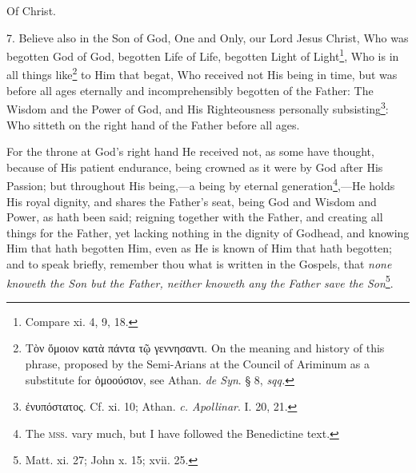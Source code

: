 Of Christ.

7. Believe also in the Son of God, One and Only, our Lord Jesus Christ, Who was begotten God of God, begotten Life of Life, begotten Light of Light\footnote{Compare xi. 4, 9, 18.}, Who is in all things like\footnote{\textgreek{Τὸν ὅμοιον κατὰ πάντα τῷ γεννησαντι}. On the meaning and history of this phrase, proposed by the Semi-Arians at the Council of Ariminum as a substitute for \textgreek{ὁμοούσιον}, see Athan. \emph{de Syn}. § 8, \emph{sqq.}} to Him that begat, Who received not His being in time, but was before all ages eternally and incomprehensibly begotten of the Father: The Wisdom and the Power of God, and His Righteousness personally subsisting\footnote{\textgreek{ἐνυπόστατος}. Cf. xi. 10; Athan. \emph{c. Apollinar}. I. 20, 21.}: Who sitteth on the right hand of the Father before all ages.

For the throne at God’s right hand He received not, as some have thought, because of His patient endurance, being crowned as it were by God after His Passion; but throughout His being,—a being by eternal generation\footnote{The \textsc{mss.} vary much, but I have followed the Benedictine text.},—He holds His royal dignity, and shares the Father’s seat, being God and Wisdom and Power, as hath been said; reigning together with the Father, and creating all things for the Father, yet lacking nothing in the dignity of Godhead, and knowing Him that hath begotten Him, even as He is known of Him that hath begotten; and to speak briefly, remember thou what is written in the Gospels, that \emph{none knoweth the Son but the Father, neither knoweth any the Father save the Son}\footnote{Matt. xi. 27; John x. 15; xvii. 25.}.

